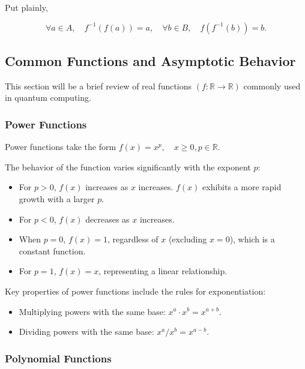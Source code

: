 \documentclass[12pt]{article}
\begin{document}
Put plainly, 

$$\forall a \in A, \quad f^{-1}(f(a)) = a, \quad \forall b \in B, \quad f(f^{-1}(b)) = b.$$


\subsection{Common Functions and Asymptotic Behavior}

This section will be a brief review of real functions $(f: \mathbb{R} \rightarrow \mathbb{R})$ commonly used in quantum computing. 
\subsubsection*{Power Functions}

Power functions take the form $f(x) = x^p, \quad x \geq 0, p \in \mathbb{R}$. 

The behavior of the function varies significantly with the exponent $p$:

\begin{itemize}
    \item For $p > 0$, $f(x)$ increases as $x$ increases. $f(x)$ exhibits a more rapid growth with a larger $p$.
    
    \item For $p < 0$, $f(x)$ decreases as $x$ increases.
    
    \item When $p = 0$, $f(x) = 1$, regardless of $x$ (excluding $x = 0$), which is a constant function.
    
    \item For $p = 1$, $f(x) = x$, representing a linear relationship.
\end{itemize}

Key properties of power functions include the rules for exponentiation:

\begin{itemize}
    \item Multiplying powers with the same base: $x^a \cdot x^b = x^{a+b}$.
    
    \item Dividing powers with the same base: $x^a / x^b = x^{a-b}$.
\end{itemize}

\subsubsection*{Polynomial Functions}
\end{document}

